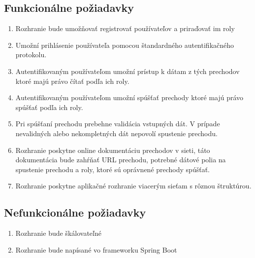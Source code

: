   

\subsection{Funkcionálne požiadavky} 

\begin{enumerate} 

    \item Rozhranie bude umožňovať registrovať používateľov a priraďovať im roly 

    \item Umožní prihlásenie používateľa pomocou štandardného autentifikačného protokolu. 

    \item Autentifikovaným používateľom umožní prístup k dátam z tých prechodov ktoré majú právo čítať podľa ich roly. 

    \item Autentifikovaným používateľom umožní spúšťať prechody ktoré majú právo spúšťať podľa ich roly. 

    \item Pri spúšťaní prechodu prebehne validácia vstupných dát. V prípade nevalidných alebo nekompletných dát nepovolí spustenie prechodu. 

    \item Rozhranie poskytne online dokumentáciu prechodov v sieti, táto dokumentácia bude zahŕňať URL prechodu, potrebné dátové polia na spustenie prechodu a roly, ktoré sú oprávnené prechody spúšťať. 

    \item Rozhranie poskytne aplikačné rozhranie viacerým sieťam s rôznou štruktúrou. 

\end{enumerate}     

  

  

  

\subsection{Nefunkcionálne požiadavky} 

\begin{enumerate} 

    \item Rozhranie bude škálovateľné 

    \item Rozhranie bude napísané vo frameworku Spring Boot 

\end{enumerate} 

